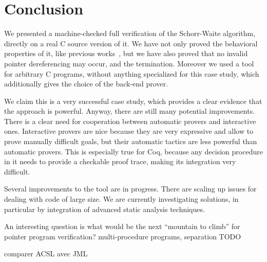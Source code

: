 \section{Conclusion}
\label{sec:conclusion}

We presented a machine-checked full verification of the Schorr-Waite
algorithm, directly on a real C source version of it. We have not only
proved the behavioral properties of it, like previous
works~\cite{bornat00mpc,mehta03cade}, but we have also proved that no
invalid pointer dereferencing may occur, and the
termination. Moreover we used a tool for arbitrary C programs, without
anything specialized for this case study, which additionally gives the
choice of the back-end prover.

We claim this is a very successful case study, which provides a clear
evidence that the \caduceus{} approach is powerful. Anyway, there are
still many potential improvements. There is a clear need for
cooperation between automatic provers and interactive
ones. Interactive provers are nice because they are very expressive
and allow to prove manually difficult goals, but their automatic
tactics are less powerful than automatic provers. This is especially
true for Coq, because any decision procedure in it needs to provide a
checkable proof trace, making its integration very difficult.

Several improvements to the \caduceus{} tool are in progress. There are
scaling up issues for dealing with code of large size. We are
currently investigating solutions, in particular by integration of
advanced static analysis techniques.

An interesting question is what would be the next ``mountain to
climb'' for pointer program verification? multi-procedure programs,
separation {\Huge TODO}

{\Huge comparer ACSL avec JML}


